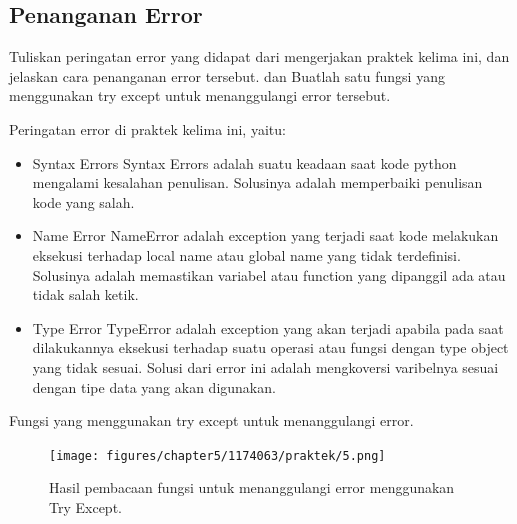\subsection{Penanganan Error}
Tuliskan  peringatan  error  yang  didapat  dari  mengerjakan  praktek  kelima  ini, dan  jelaskan  cara  penanganan  error  tersebut.   dan  Buatlah  satu  fungsi  yang menggunakan try except untuk menanggulangi error tersebut.

\hfill \break
Peringatan error di praktek kelima ini, yaitu:
\begin{itemize}
	\item Syntax Errors
	Syntax Errors adalah suatu keadaan saat kode python mengalami kesalahan penulisan. Solusinya adalah memperbaiki penulisan kode yang salah.
	
	\item Name Error
	NameError adalah exception yang terjadi saat kode melakukan eksekusi terhadap local name atau global name yang tidak terdefinisi. Solusinya adalah memastikan variabel atau function yang dipanggil ada atau tidak salah ketik.
	
	\item Type Error
	TypeError adalah exception yang akan terjadi apabila pada saat dilakukannya eksekusi terhadap suatu operasi atau fungsi dengan type object yang tidak sesuai. Solusi dari error ini adalah mengkoversi varibelnya sesuai dengan tipe data yang akan digunakan.
\end{itemize}

\hfill \break
Fungsi yang menggunakan try except untuk menanggulangi error.



\begin{figure}[H]
	\texttt{[image: figures/chapter5/1174063/praktek/5.png]}
	\centering
	\caption{Hasil pembacaan fungsi untuk menanggulangi error menggunakan Try Except.}
\end{figure}
